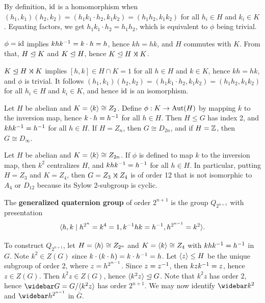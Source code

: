 \begin{proofitem}
    \item By definition, $\operatorname{id}$ is a homomorphism when $(h_1, k_1)(h_2, k_2) = (h_1k_1 \cdot h_2, k_1k_2) = (h_1h_2, k_1k_2)$ for all $h_i \in H$ and $k_i \in K$. Equating factors, we get $h_1 k_1 \cdot h_2 = h_1h_2$, which is equivalent to $\phi$ being trivial.
    \item $\phi = \operatorname{id}$ implies $khk^{-1} = k \cdot h = h$, hence $kh = hk$, and $H$ commutes with $K$. From that, $H \trianglelefteq K$ and $K \trianglelefteq H$, hence $K \nsub H \semidir K$.
    \item $K \nsub H \semidir K$ implies $[h, k] \in H \cap K = 1$ for all $h \in H$ and $k \in K$, hence $kh = hk$, and $\phi$ is trivial. It follows $(h_1, k_1)(h_2, k_2) = (h_1k_1 \cdot h_2, k_1k_2) = (h_1h_2, k_1k_2)$ for all $h_i \in H$ and $k_i \in K$, and hence $\operatorname{id}$ is an isomorphism.
\end{proofitem}

\ex Let $H$ be abelian and $K = \langle k\rangle \cong Z_2$. Define $\phi : K \to \operatorname{Aut}(H)$ by mapping $k$ to the inversion map, hence $k \cdot h = h^{-1}$ for all $h \in H$. Then $H \leq G$ has index 2, and $khk^{-1} = h^{-1}$ for all $h \in H$. If $H = Z_n$, then $G \cong D_{2n}$, and if $H = \mathbb Z$, then $G \cong D_\infty$.

\ex Let $H$ be abelian and $K = \langle k\rangle \cong Z_{2n}$. If $\phi$ is defined to map $k$ to the inversion map, then $k^2$ centralizes $H$, and $khk^{-1} = h^{-1}$ for all $h \in H$. In particular, putting $H = Z_3$ and $K = Z_4$, then $G = Z_3 \semidir Z_4$ is of order 12 that is not isomorphic to $A_4$ or $D_{12}$ because its Sylow 2-subgroup is cyclic.

\newpage

 The \textbf{generalized quaternion group} of order $2^{n + 1}$ is the group $Q_{2^{n + 1}}$ with presentation
\[\langle h, k \mid h^{2^n} = k^4 = 1, k^{-1} hk = h^{-1}, h^{2^{n-1}} = k^2\rangle.\]

\ex To construct $Q_{2^{n + 1}}$, let $H = \langle h\rangle \cong Z_{2^n}$ and $K = \langle k\rangle \cong Z_4$ with $khk^{-1} = h^{-1}$ in $G$. Note $k^2 \in Z(G)$ since $k \cdot (k \cdot h) = k \cdot h^{-1} = h$. Let $\langle z\rangle \leq H$ be the unique subgroup of order 2, where $z = \smash{h^{2^{n-1}}}$. Since $z = z^{-1}$, then $kzk^{-1} = z$, hence $z \in Z(G)$. Then $k^2z \in Z(G)$, hence $\langle k^2z\rangle \trianglelefteq G$. Note that $k^2z$ has order 2, hence $\bar G = G/\gen{k^2z}$ has order $2^{n + 1}$. We may now identify $\bbar k[2]$ and $\bbar h[2^{n-1}]$ in $\bar G$.

